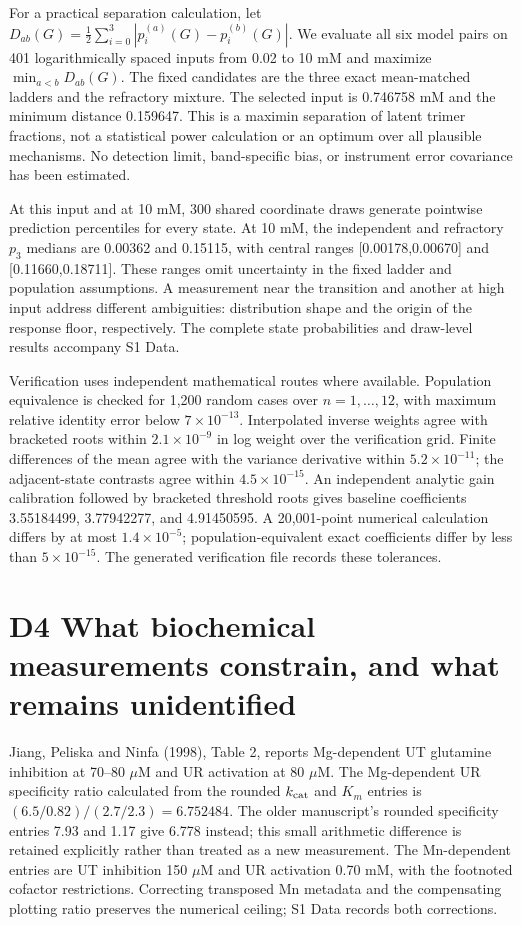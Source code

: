 \documentclass[11pt]{article}
\begin{document}
For a practical separation calculation, let $D_{ab}(G)=\tfrac12\sum_{i=0}^3|p_i^{(a)}(G)-p_i^{(b)}(G)|$. We evaluate all six model pairs on 401 logarithmically spaced inputs from 0.02 to 10 mM and maximize $\min_{a<b}D_{ab}(G)$. The fixed candidates are the three exact mean-matched ladders and the refractory mixture. The selected input is 0.746758 mM and the minimum distance 0.159647. This is a maximin separation of latent trimer fractions, not a statistical power calculation or an optimum over all plausible mechanisms. No detection limit, band-specific bias, or instrument error covariance has been estimated.

At this input and at 10 mM, 300 shared coordinate draws generate pointwise prediction percentiles for every state. At 10 mM, the independent and refractory $p_3$ medians are 0.00362 and 0.15115, with central ranges [0.00178,0.00670] and [0.11660,0.18711]. These ranges omit uncertainty in the fixed ladder and population assumptions. A measurement near the transition and another at high input address different ambiguities: distribution shape and the origin of the response floor, respectively. The complete state probabilities and draw-level results accompany S1 Data.

Verification uses independent mathematical routes where available. Population equivalence is checked for 1,200 random cases over $n=1,\ldots,12$, with maximum relative identity error below $7\times10^{-13}$. Interpolated inverse weights agree with bracketed roots within $2.1\times10^{-9}$ in log weight over the verification grid. Finite differences of the mean agree with the variance derivative within $5.2\times10^{-11}$; the adjacent-state contrasts agree within $4.5\times10^{-15}$. An independent analytic gain calibration followed by bracketed threshold roots gives baseline coefficients 3.55184499, 3.77942277, and 4.91450595. A 20,001-point numerical calculation differs by at most $1.4\times10^{-5}$; population-equivalent exact coefficients differ by less than $5\times10^{-15}$. The generated verification file records these tolerances.

\clearpage\renewcommand{\thefigure}{S\arabic{figure}}\setcounter{figure}{0}

\section*{D4 What biochemical measurements constrain, and what remains unidentified}

Jiang, Peliska and Ninfa (1998), Table 2, reports Mg-dependent UT glutamine inhibition at 70--80 $\mu$M and UR activation at 80 $\mu$M. The Mg-dependent UR specificity ratio calculated from the rounded $k_{\rm cat}$ and $K_m$ entries is $(6.5/0.82)/(2.7/2.3)=6.752484$. The older manuscript's rounded specificity entries 7.93 and 1.17 give 6.778 instead; this small arithmetic difference is retained explicitly rather than treated as a new measurement. The Mn-dependent entries are UT inhibition 150 $\mu$M and UR activation 0.70 mM, with the footnoted cofactor restrictions. Correcting transposed Mn metadata and the compensating plotting ratio preserves the numerical ceiling; S1 Data records both corrections.
\end{document}
